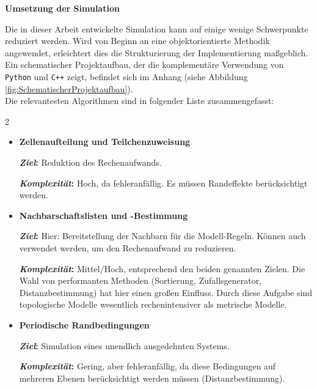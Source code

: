 \documentclass{solutionclass}
\begin{document}
\textbf{Umsetzung der Simulation}

Die in dieser Arbeit entwickelte Simulation kann auf einige wenige Schwerpunkte reduziert werden. Wird von Beginn an eine objektorientierte Methodik angewendet, erleichtert dies die Strukturierung der Implementierung maßgeblich. Ein schematischer Projektaufbau, der die komplementäre Verwendung von \texttt{Python} und \texttt{C++} zeigt, befindet sich im Anhang (siehe Abbildung \ref{fig:SchematischerProjektaufbau}). \\

Die relevantesten Algorithmen sind in folgender Liste zusammengefasst:

\begin{task}
\begin{multicols}{2}
    \begin{itemize}[left=0em, itemsep=0em, topsep=0em, parsep=0em]
        \item {\fontsize{11}{14}\selectfont \textbf{Zellenaufteilung und Teilchenzuweisung}}

        \;\;\textbf{\textit{Ziel}:} Reduktion des Rechenaufwands.
        
        \;\;\textbf{\textit{Komplexität}:} Hoch, da fehleranfällig. Es müssen Randeffekte berücksichtigt werden.\\
        
        \item {\fontsize{11}{14}\selectfont \textbf{Nachbarschaftslisten und -Bestimmung}}

        \;\;\textbf{\textit{Ziel}:} Hier: Bereitstellung der Nachbarn für die Modell-Regeln. Können auch verwendet werden, um den Rechenaufwand zu reduzieren.
        
        \;\;\textbf{\textit{Komplexität}:} Mittel/Hoch, entsprechend den beiden genannten Zielen. Die Wahl von performanten Methoden (Sortierung, Zufallsgenerator, Distanzbestimmung) hat hier einen großen Einfluss. Durch diese Aufgabe sind topologische Modelle wesentlich rechenintensiver als metrische Modelle.
        
        \item {\fontsize{11}{14}\selectfont \textbf{Periodische Randbedingungen}}

        \;\;\textbf{\textit{Ziel}:} Simulation eines unendlich ausgedehnten Systems.
        
        \;\;\textbf{\textit{Komplexität}:} Gering, aber fehleranfällig, da diese Bedingungen auf mehreren Ebenen berücksichtigt werden müssen (Distanzbestimmung).\\
        

\end{itemize}
\end{multicols}
\end{task}
\end{document}
